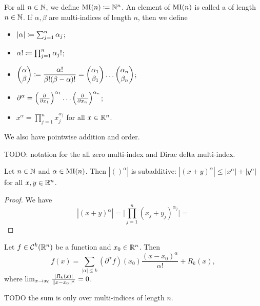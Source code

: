 \begin{definition}
For all $n\in \mathbb{N}$, we define $\operatorname{MI}(n) \coloneqq \mathbb{N}^n$. An element of $\operatorname{MI}(n)$ is called a  of length $n\in \mathbb{N}$. If $\alpha, \beta$ are multi-indices of length $n$, then we define
\begin{itemize}
\item $|\alpha| \coloneqq \sum_{j=1}^n\alpha_j$;
\item $\alpha! \coloneqq \prod_{j=1}^n\alpha_j!$;
\item $\displaystyle\begin{pmatrix}
\alpha \\ \beta
\end{pmatrix} \coloneqq \frac{\alpha!}{\beta!(\beta - \alpha)!} = \begin{pmatrix}
\alpha_1 \\ \beta_1
\end{pmatrix}\hdots \begin{pmatrix}
\alpha_n \\ \beta_n
\end{pmatrix}$;
\item $\partial^\alpha = \Big( \frac{\partial{^{}}}{\partial{{x_1}^{}}} \Big)^{\alpha_1}\hdots\Big( \frac{\partial{^{}}}{\partial{{x_n}^{}}} \Big)^{\alpha_n}$;
\item $x^\alpha = \prod_{j=1}^n x_j^{\alpha_j}$ for all $x\in \mathbb{R}^n$.
\end{itemize}
We also have pointwise addition and order.
\end{definition}

TODO: notation for the all zero multi-index and Dirac delta multi-index.

\begin{lemma}
Let $n\in\mathbb{N}$ and $\alpha \in \operatorname{MI}(n)$. Then $|()^\alpha|$ is subadditive: $|(x+y)^\alpha| \leq |x^\alpha| + |y^\alpha|$ for all $x,y\in \mathbb{R}^n$.
\end{lemma}
\begin{proof}
We have
\[ |(x+y)^\alpha| = \Big|\prod_{j=1}^n(x_j+ y_j)^{\alpha_j}\Big| =  \]
\end{proof}

\begin{proposition}
Let $f\in \operatorname{\mathcal{C}}^k(\mathbb{R}^n)$ be a function and $x_0\in \mathbb{R}^n$. Then
\[ f(x) = \sum_{|\alpha|\leq k}(\partial^\alpha f)(x_0)\frac{(x-x_0)^\alpha}{\alpha!} + R_k(x), \]
where $\lim_{x\to x_0}\frac{|R_k(x)|}{\lVert x-x_0\rVert^k} = 0$.
\end{proposition}
TODO the sum is only over multi-indices of length $n$.

